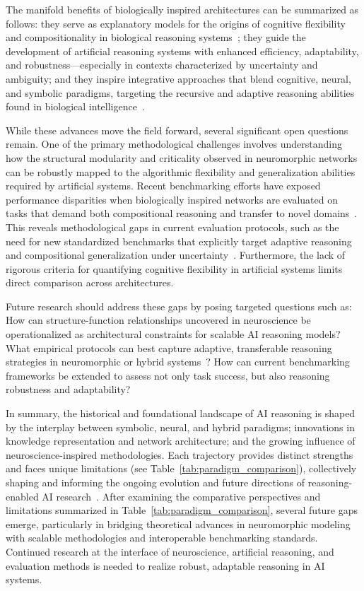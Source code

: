 \documentclass[sigconf]{acmart}
\begin{document}
The manifold benefits of biologically inspired architectures can be summarized as follows: they serve as explanatory models for the origins of cognitive flexibility and compositionality in biological reasoning systems~\cite{ref90}; they guide the development of artificial reasoning systems with enhanced efficiency, adaptability, and robustness---especially in contexts characterized by uncertainty and ambiguity; and they inspire integrative approaches that blend cognitive, neural, and symbolic paradigms, targeting the recursive and adaptive reasoning abilities found in biological intelligence~\cite{ref49,ref90}.

While these advances move the field forward, several significant open questions remain. One of the primary methodological challenges involves understanding how the structural modularity and criticality observed in neuromorphic networks can be robustly mapped to the algorithmic flexibility and generalization abilities required by artificial systems. Recent benchmarking efforts have exposed performance disparities when biologically inspired networks are evaluated on tasks that demand both compositional reasoning and transfer to novel domains~\cite{ref90}. This reveals methodological gaps in current evaluation protocols, such as the need for new standardized benchmarks that explicitly target adaptive reasoning and compositional generalization under uncertainty~\cite{ref49,ref90}. Furthermore, the lack of rigorous criteria for quantifying cognitive flexibility in artificial systems limits direct comparison across architectures.

Future research should address these gaps by posing targeted questions such as: How can structure-function relationships uncovered in neuroscience be operationalized as architectural constraints for scalable AI reasoning models? What empirical protocols can best capture adaptive, transferable reasoning strategies in neuromorphic or hybrid systems~\cite{ref49,ref90}? How can current benchmarking frameworks be extended to assess not only task success, but also reasoning robustness and adaptability?

In summary, the historical and foundational landscape of AI reasoning is shaped by the interplay between symbolic, neural, and hybrid paradigms; innovations in knowledge representation and network architecture; and the growing influence of neuroscience-inspired methodologies. Each trajectory provides distinct strengths and faces unique limitations (see Table~\ref{tab:paradigm_comparison}), collectively shaping and informing the ongoing evolution and future directions of reasoning-enabled AI research~\cite{ref42,ref49,ref54,ref86,ref90,ref100}. After examining the comparative perspectives and limitations summarized in Table~\ref{tab:paradigm_comparison}, several future gaps emerge, particularly in bridging theoretical advances in neuromorphic modeling with scalable methodologies and interoperable benchmarking standards. Continued research at the interface of neuroscience, artificial reasoning, and evaluation methods is needed to realize robust, adaptable reasoning in AI systems.
\end{document}
